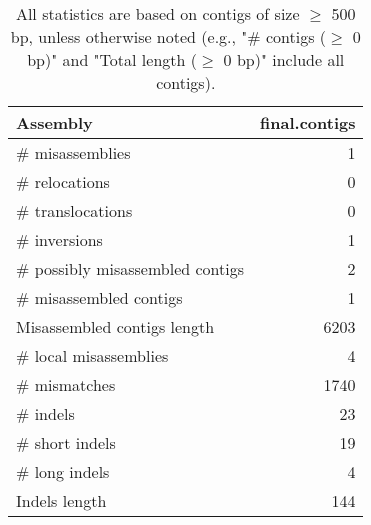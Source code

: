 \documentclass[12pt,a4paper]{article}
\begin{document}
\begin{table}[ht]
\begin{center}
\caption{All statistics are based on contigs of size $\geq$ 500 bp, unless otherwise noted (e.g., "\# contigs ($\geq$ 0 bp)" and "Total length ($\geq$ 0 bp)" include all contigs).}
\begin{tabular}{|l*{1}{|r}|}
\hline
Assembly & final.contigs \\ \hline
\# misassemblies & 1 \\ \hline
\hspace{5mm}\# relocations & 0 \\ \hline
\hspace{5mm}\# translocations & 0 \\ \hline
\hspace{5mm}\# inversions & 1 \\ \hline
\# possibly misassembled contigs & 2 \\ \hline
\# misassembled contigs & 1 \\ \hline
Misassembled contigs length & 6203 \\ \hline
\# local misassemblies & 4 \\ \hline
\# mismatches & 1740 \\ \hline
\# indels & 23 \\ \hline
\hspace{5mm}\# short indels & 19 \\ \hline
\hspace{5mm}\# long indels & 4 \\ \hline
Indels length & 144 \\ \hline
\end{tabular}
\end{center}
\end{table}
\end{document}
